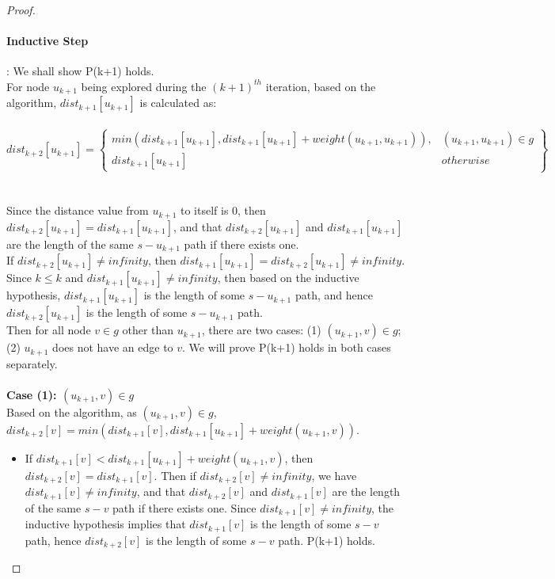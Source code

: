 \begin{proof}
\paragraph*{Inductive Step}: We shall show P(k+1) holds.
\\
For node $u_{k+1}$ being explored during the $(k+1)^{th}$ iteration, based on the algorithm, $dist_{k+1}[u_{k+1}]$ is calculated as: 
\\\\
\tab\[
        dist_{k+2}[u_{k+1}] = \left.
       \begin{cases} 
          min(dist_{k+1}[u_{k+1}], dist_{k+1}[u_{k+1}] + weight(u_{k+1},u_{k+1})), & (u_{k+1},u_{k+1}) \in g \\ 
          dist_{k+1}[u_{k+1}] & otherwise 
        \end{cases}
        \right\}
      \]
\\\\
Since the distance value from $u_{k+1}$ to itself is $0$, then $dist_{k+2}[u_{k+1}] = dist_{k+1}[u_{k+1}]$, and that $dist_{k+2}[u_{k+1}]$ and $dist_{k+1}[u_{k+1}]$ are the length of the same $s-u_{k+1}$ path if there exists one. 
\\
If $dist_{k+2}[u_{k+1}] \neq infinity$, then $dist_{k+1}[u_{k+1}] = dist_{k+2}[u_{k+1}] \neq infinity$. Since $k \leq k$ and $dist_{k+1}[u_{k+1}] \neq infinity$, then based on the inductive hypothesis, $dist_{k+1}[u_{k+1}]$ is the length of some $s-u_{k+1}$ path, and hence $dist_{k+2}[u_{k+1}]$ is the length of some $s-u_{k+1}$ path.
\\
Then for all node $v \in g$ other than $u_{k+1}$, there are two cases: (1) $(u_{k+1}, v) \in g$; (2) $u_{k+1}$ does not have an edge to $v$. We will prove P(k+1) holds in both cases separately. 
\\\\
\textbf{Case (1): $(u_{k+1}, v) \in g$}
\tab\\
Based on the algorithm, as $(u_{k+1}, v) \in g$, $dist_{k+2}[v] = min(dist_{k+1}[v], dist_{k+1}[u_{k+1}] + weight(u_{k+1}, v))$. 
\begin{itemize}
  \item If $dist_{k+1}[v] < dist_{k+1}[u_{k+1}] + weight(u_{k+1}, v)$, then $dist_{k+2}[v] = dist_{k+1}[v]$. Then if $dist_{k+2}[v] \neq infinity$, we have $dist_{k+1}[v] \neq infinity$, and that $dist_{k+2}[v]$ and $dist_{k+1}[v]$ are the length of the same $s-v$ path if there exists one. Since $dist_{k+1}[v] \neq infinity$, the inductive hypothesis implies that $dist_{k+1}[v]$ is the length of some $s-v$ path, hence $dist_{k+2}[v]$ is the length of some $s-v$ path. P(k+1) holds. 


\end{itemize}
\end{proof}
